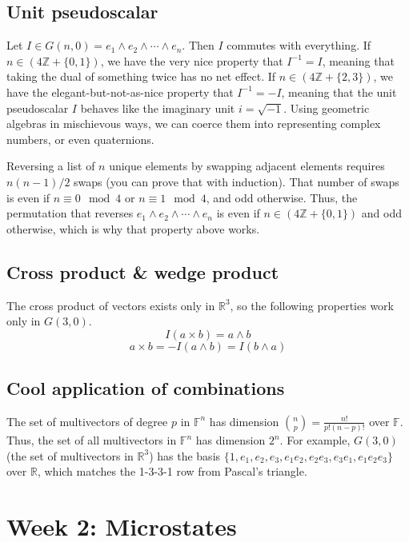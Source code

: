 \documentclass[12pt]{article}
\begin{document}
\subsection{Unit pseudoscalar}
Let $I \in G(n, 0) = e_1 \wedge e_2 \wedge \cdots \wedge e_n$. Then $I$ commutes with everything. If $n \in (4 \mathbb{Z} + \{0, 1\})$, we have the very nice property that $I^{-1} = I$, meaning that taking the dual of something twice has no net effect. If $n \in (4 \mathbb{Z} + \{2, 3\})$, we have the elegant-but-not-as-nice property that $I^{-1} = -I$, meaning that the unit pseudoscalar $I$ behaves like the imaginary unit $i = \sqrt{-1}$. Using geometric algebras in mischievous ways, we can coerce them into representing complex numbers, or even quaternions.

Reversing a list of $n$ unique elements by swapping adjacent elements requires $n(n-1)/2$ swaps (you can prove that with induction). That number of swaps is even if $n \equiv 0 \mod{4}$ or $n \equiv 1 \mod{4}$, and odd otherwise. Thus, the permutation that reverses $e_1 \wedge e_2 \wedge \cdots \wedge e_n$ is even if $n \in (4 \mathbb{Z} + \{0, 1\})$ and odd otherwise, which is why that property above works.

\subsection{Cross product \& wedge product}
The cross product of vectors exists only in $\mathbb{R}^3$, so the following properties work only in $G(3, 0)$.
\[I (a \times b) = a \wedge b\]
\[a \times b = -I (a \wedge b) = I (b \wedge a)\]


\subsection{Cool application of combinations}
The set of multivectors of degree $p$ in $\mathbb{F}^n$ has dimension ${n \choose p} = \frac{n!}{p!(n-p)!} $ over $\mathbb{F}$. Thus, the set of all multivectors in $\mathbb{F}^n$ has dimension $2^n$. For example, $G(3,0)$ (the set of multivectors in $\mathbb{R}^3$) has the basis $\{1, e_1, e_2, e_3, e_1 e_2, e_2 e_3, e_3 e_1, e_1 e_2 e_3\}$ over $\mathbb{R}$, which matches the 1-3-3-1 row from Pascal's triangle.

\section{Week 2: Microstates}
\end{document}
